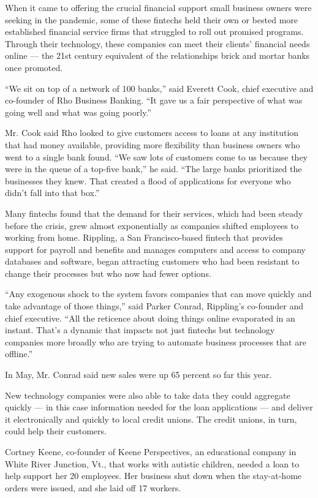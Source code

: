 When it came to offering the crucial financial support small business
owners were seeking in the pandemic, some of these fintechs held their
own or bested more established financial service firms that struggled to
roll out promised programs. Through their technology, these companies
can meet their clients' financial needs online --- the 21st century
equivalent of the relationships brick and mortar banks once promoted.

``We sit on top of a network of 100 banks,'' said Everett Cook, chief
executive and co-founder of Rho Business Banking. ``It gave us a fair
perspective of what was going well and what was going poorly.''

Mr. Cook said Rho looked to give customers access to loans at any
institution that had money available, providing more flexibility than
business owners who went to a single bank found. ``We saw lots of
customers come to us because they were in the queue of a top-five
bank,'' he said. ``The large banks prioritized the businesses they knew.
That created a flood of applications for everyone who didn't fall into
that box.''

Many fintechs found that the demand for their services, which had been
steady before the crisis, grew almost exponentially as companies shifted
employees to working from home. Rippling, a San Francisco-based fintech
that provides support for payroll and benefits and manages computers and
access to company databases and software, began attracting customers who
had been resistant to change their processes but who now had fewer
options.

``Any exogenous shock to the system favors companies that can move
quickly and take advantage of those things,'' said Parker Conrad,
Rippling's co-founder and chief executive. ``All the reticence about
doing things online evaporated in an instant. That's a dynamic that
impacts not just fintechs but technology companies more broadly who are
trying to automate business processes that are offline.''

In May, Mr. Conrad said new sales were up 65 percent so far this year.

New technology companies were also able to take data they could
aggregate quickly --- in this case information needed for the loan
applications --- and deliver it electronically and quickly to local
credit unions. The credit unions, in turn, could help their customers.

Cortney Keene, co-founder of Keene Perspectives, an educational company
in White River Junction, Vt., that works with autistic children, needed
a loan to help support her 20 employees. Her business shut down when the
stay-at-home orders were issued, and she laid off 17 workers.


